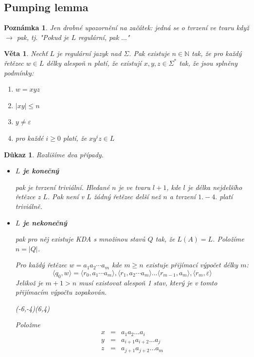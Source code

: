 \documentclass[10pt, a4paper, titlepage]{article}
\theoremstyle{note}
\newtheorem{veta}{Věta}
\newtheorem{dukaz}{Důkaz}
\newtheorem{poznamka}{Poznámka}
\begin{document}
\subsection{Pumping lemma}

\begin{poznamka}
Jen drobné upozornění na začátek: jedná se o tvrzení ve tvaru když $\rightarrow$ pak, tj. "Pokud je $L$ regulární, pak $\ldots$"
\end{poznamka}

\begin{veta}
Nechť $L$ je regulární jazyk nad $\Sigma$. Pak existuje $n \in \mathbb{N}$ tak, že pro každý řetězec $w \in L$ délky alespoň $n$ platí, že existují $x,y,z \in \Sigma^*$ tak, že jsou splněny podmínky:
\begin{enumerate}
\item
$w = xyz$
\item
$|xy| \le n$
\item
$y \neq \varepsilon$
\item
pro každé $i \ge 0$ platí, že $xy^iz \in L$
\end{enumerate}
\end{veta}

\begin{dukaz}
Rozlišíme dva případy.
\begin{itemize}
\item
\textbf{$L$ je konečný}
 
pak je tvrzení triviální. Hledané $n$ je ve tvaru $l+1$, kde $l$ je délka nejdelšího řetězce z $L$. Pak není v $L$ žádný řetězec delší než $n$ a tvrzení $1. - 4.$ platí triviálně.
 
\item
\textbf{$L$ je nekonečný} 

pak pro něj existuje KDA s množinou stavů $Q$ tak, že $L(A) = L$. Položíme $n=|Q|$.

Pro každý řetězec $w=a_1a_2\cdots a_m$ kde $m \ge n$ existuje přijímací výpočet
délky $m$:
$$
\langle q_0,w \rangle = \langle r_0, a_1\cdots a_m \rangle,\langle r_1, a_2\cdots a_m \rangle \ldots \langle r_{m-1}, a_m \rangle, \langle r_m, \varepsilon \rangle
$$
Jelikož je $m+1 > n$ musí existovat alespoň 1 stav, který je v tomto přijímacím výpočtu zopakován.

\begin{center}
\begin{VCPicture}{(-6,-4)(6,4)}


\end{VCPicture}
\end{center}
Položme
\begin{eqnarray*}
x &=& a_{1}a_{2}\ldots a_{i} \\
y &=& a_{i+1}a_{i+2}\ldots a_{j} \\
z &=& a_{j+1}a_{j+2}\ldots a_{m}
\end{eqnarray*}
\end{itemize}
\end{dukaz}
\end{document}
